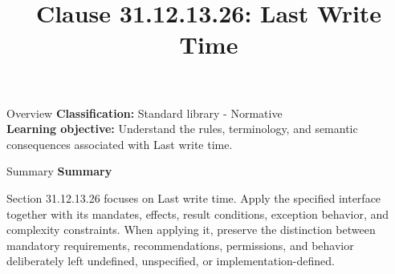 \documentclass[10pt,letterpaper]{article}
\title{Clause 31.12.13.26: Last Write Time}
\author{}
\date{}
\begin{document}
\maketitle
\begin{CornellOverviewBox}{Overview}
\textbf{Classification:} Standard library - Normative\\[2pt]
\textbf{Learning objective:} Understand the rules, terminology, and semantic consequences associated with Last write time.
\end{CornellOverviewBox}\begin{CornellSummaryBox}{Summary}
{\sffamily\bfseries\color{Accent} Summary}\par\vspace{3pt}Section 31.12.13.26 focuses on Last write time. Apply the specified interface together with its mandates, effects, result conditions, exception behavior, and complexity constraints. When applying it, preserve the distinction between mandatory requirements, recommendations, permissions, and behavior deliberately left undefined, unspecified, or implementation-defined.
\end{CornellSummaryBox}
\end{document}
